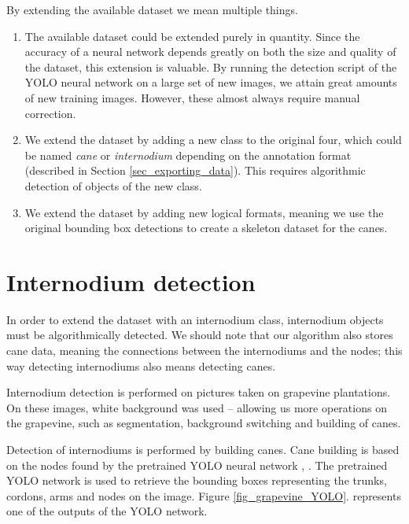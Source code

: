 \documentclass{PSAIE}%
\begin{document}
By extending the available dataset we mean multiple things.
\begin{enumerate}
      \item The available dataset could be extended purely in quantity. Since the accuracy of a neural network
            depends greatly on both the size and quality of the dataset, this extension is valuable.
            By running the detection script of the YOLO neural network on a large set of new images,
            we attain great amounts of new training images. However, these almost always require
            manual correction.
      \item We extend the dataset by adding a new class to the original four, which could be named \textit{cane}
            or \textit{internodium} depending on the annotation format (described in Section
            \ref{sec_exporting_data}). This requires algorithmic detection of objects of the new class.
      \item We extend the dataset by adding new logical formats, meaning we use the original bounding box
            detections to create a skeleton dataset for the canes.
\end{enumerate}


\section{Internodium detection} \label{sec_internodium_detection}
In order to extend the dataset with an internodium class, internodium objects must be algorithmically
detected. We should note that our algorithm also stores cane data, meaning the connections between the
internodiums and the nodes; this way detecting internodiums also means detecting canes.

Internodium detection is performed on pictures taken on grapevine plantations. On these images, white
background was used -- allowing us more operations on the grapevine, such as segmentation, background
switching and building of canes.

Detection of internodiums is performed by building canes. Cane building is based on the nodes found by the
pretrained YOLO neural network \cite{bolyki_2021}, \cite{glenn_jocher_2021_5563715}. The pretrained YOLO
network is used to retrieve the bounding boxes representing the trunks, cordons, arms and nodes on the image.
Figure \ref{fig_grapevine_YOLO}. represents one of the outputs of the YOLO network.
\end{document}
